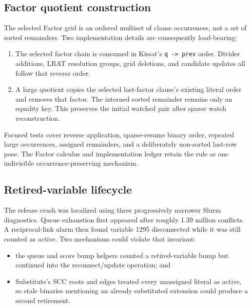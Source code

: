 \documentclass[11pt]{article}
\newcommand{\code}[1]{\nolinkurl{#1}}
\newcommand{\kissat}{Kissat}
\begin{document}
\subsection{Factor quotient construction}

The selected Factor grid is an ordered multiset of clause occurrences, not a
set of sorted remainders.  Two implementation details are consequently
load-bearing:

\begin{enumerate}[leftmargin=*,itemsep=2pt]
  \item The selected factor chain is consumed in \kissat{}'s
  \code{q -> prev} order.  Divider additions, LRAT resolution groups, grid
  deletions, and candidate updates all follow that reverse order.
  \item A large quotient copies the selected last-factor clause's existing
  literal order and removes that factor.  The interned sorted remainder remains
  only an equality key.  This preserves the initial watched pair after sparse
  watch reconstruction.
\end{enumerate}

Focused tests cover reverse application, sparse-resume binary order, repeated
large occurrences, assigned remainders, and a deliberately non-sorted
last-row pose.  The Factor calculus and implementation ledger retain the rule
as one indivisible occurrence-preserving mechanism.

\subsection{Retired-variable lifecycle}

The release crash was localized using three progressively narrower Slurm
diagnostics.  Queue exhaustion first appeared after roughly 1.39 million
conflicts.  A reciprocal-link alarm then found variable 1295 disconnected
while it was still counted as active.  Two mechanisms could violate that
invariant:

\begin{itemize}[leftmargin=*,itemsep=2pt]
  \item the queue and score bump helpers counted a retired-variable bump but
  continued into the reconnect/update operation; and
  \item Substitute's SCC roots and edges treated every unassigned literal as
  active, so stale binaries mentioning an already substituted extension could
  produce a second retirement.
\end{itemize}
\end{document}
